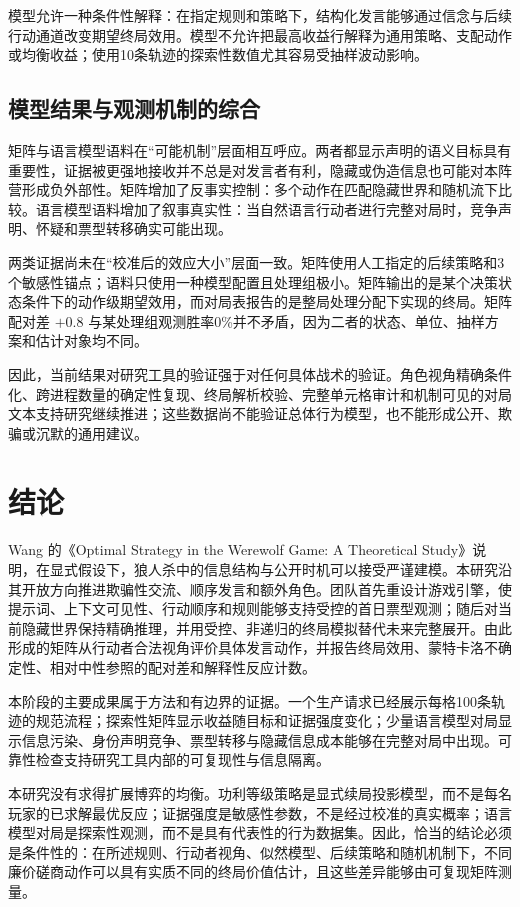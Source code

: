 \documentclass[UTF8,11pt,a4paper,fontset=windows]{ctexart}
\begin{document}
模型允许一种条件性解释：在指定规则和策略下，结构化发言能够通过信念与后续行动通道改变期望终局效用。模型不允许把最高收益行解释为通用策略、支配动作或均衡收益；使用10条轨迹的探索性数值尤其容易受抽样波动影响。

\subsection{模型结果与观测机制的综合}

矩阵与语言模型语料在“可能机制”层面相互呼应。两者都显示声明的语义目标具有重要性，证据被更强地接收并不总是对发言者有利，隐藏或伪造信息也可能对本阵营形成负外部性。矩阵增加了反事实控制：多个动作在匹配隐藏世界和随机流下比较。语言模型语料增加了叙事真实性：当自然语言行动者进行完整对局时，竞争声明、怀疑和票型转移确实可能出现。

两类证据尚未在“校准后的效应大小”层面一致。矩阵使用人工指定的后续策略和3个敏感性锚点；语料只使用一种模型配置且处理组极小。矩阵输出的是某个决策状态条件下的动作级期望效用，而对局表报告的是整局处理分配下实现的终局。矩阵配对差 $+0.8$ 与某处理组观测胜率0\%并不矛盾，因为二者的状态、单位、抽样方案和估计对象均不同。

因此，当前结果对研究工具的验证强于对任何具体战术的验证。角色视角精确条件化、跨进程数量的确定性复现、终局解析校验、完整单元格审计和机制可见的对局文本支持研究继续推进；这些数据尚不能验证总体行为模型，也不能形成公开、欺骗或沉默的通用建议。

\section{结论}

Wang 的《Optimal Strategy in the Werewolf Game: A Theoretical Study》说明，在显式假设下，狼人杀中的信息结构与公开时机可以接受严谨建模。本研究沿其开放方向推进欺骗性交流、顺序发言和额外角色。团队首先重设计游戏引擎，使提示词、上下文可见性、行动顺序和规则能够支持受控的首日票型观测；随后对当前隐藏世界保持精确推理，并用受控、非递归的终局模拟替代未来完整展开。由此形成的矩阵从行动者合法视角评价具体发言动作，并报告终局效用、蒙特卡洛不确定性、相对中性参照的配对差和解释性反应计数。

本阶段的主要成果属于方法和有边界的证据。一个生产请求已经展示每格100条轨迹的规范流程；探索性矩阵显示收益随目标和证据强度变化；少量语言模型对局显示信息污染、身份声明竞争、票型转移与隐藏信息成本能够在完整对局中出现。可靠性检查支持研究工具内部的可复现性与信息隔离。

本研究没有求得扩展博弈的均衡。功利等级策略是显式续局投影模型，而不是每名玩家的已求解最优反应；证据强度是敏感性参数，不是经过校准的真实概率；语言模型对局是探索性观测，而不是具有代表性的行为数据集。因此，恰当的结论必须是条件性的：在所述规则、行动者视角、似然模型、后续策略和随机机制下，不同廉价磋商动作可以具有实质不同的终局价值估计，且这些差异能够由可复现矩阵测量。
\end{document}
